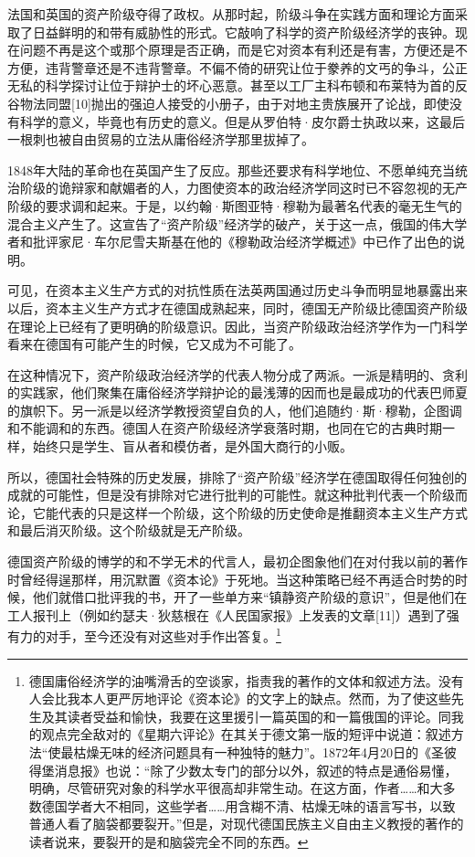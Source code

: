 \documentclass{ctexbook}
\begin{document}
法国和英国的资产阶级夺得了政权。从那时起，阶级斗争在实践方面和理论方面采取了日益鲜明的和带有威胁性的形式。它敲响了科学的资产阶级经济学的丧钟。现在问题不再是这个或那个原理是否正确，而是它对资本有利还是有害，方便还是不方便，违背警章还是不违背警章。不偏不倚的研究让位于豢养的文丐的争斗，公正无私的科学探讨让位于辩护士的坏心恶意。甚至以工厂主科布顿和布莱特为首的反谷物法同盟[10]抛出的强迫人接受的小册子，由于对地主贵族展开了论战，即使没有科学的意义，毕竟也有历史的意义。但是从罗伯特·皮尔爵士执政以来，这最后一根刺也被自由贸易的立法从庸俗经济学那里拔掉了。

1848年大陆的革命也在英国产生了反应。那些还要求有科学地位、不愿单纯充当统治阶级的诡辩家和献媚者的人，力图使资本的政治经济学同这时已不容忽视的无产阶级的要求调和起来。于是，以约翰·斯图亚特·穆勒为最著名代表的毫无生气的混合主义产生了。这宣告了“资产阶级”经济学的破产，关于这一点，俄国的伟大学者和批评家尼·车尔尼雪夫斯基在他的《穆勒政治经济学概述》中已作了出色的说明。

可见，在资本主义生产方式的对抗性质在法英两国通过历史斗争而明显地暴露出来以后，资本主义生产方式才在德国成熟起来，同时，德国无产阶级比德国资产阶级在理论上已经有了更明确的阶级意识。因此，当资产阶级政治经济学作为一门科学看来在德国有可能产生的时候，它又成为不可能了。

在这种情况下，资产阶级政治经济学的代表人物分成了两派。一派是精明的、贪利的实践家，他们聚集在庸俗经济学辩护论的最浅薄的因而也是最成功的代表巴师夏的旗帜下。另一派是以经济学教授资望自负的人，他们追随约·斯·穆勒，企图调和不能调和的东西。德国人在资产阶级经济学衰落时期，也同在它的古典时期一样，始终只是学生、盲从者和模仿者，是外国大商行的小贩。

所以，德国社会特殊的历史发展，排除了“资产阶级”经济学在德国取得任何独创的成就的可能性，但是没有排除对它进行批判的可能性。就这种批判代表一个阶级而论，它能代表的只是这样一个阶级，这个阶级的历史使命是推翻资本主义生产方式和最后消灭阶级。这个阶级就是无产阶级。

德国资产阶级的博学的和不学无术的代言人，最初企图象他们在对付我以前的著作时曾经得逞那样，用沉默置《资本论》于死地。当这种策略已经不再适合时势的时候，他们就借口批评我的书，开了一些单方来“镇静资产阶级的意识”，但是他们在工人报刊上（例如约瑟夫·狄慈根在《人民国家报》上发表的文章[11]）遇到了强有力的对手，至今还没有对这些对手作出答复。\footnote{德国庸俗经济学的油嘴滑舌的空谈家，指责我的著作的文体和叙述方法。没有人会比我本人更严厉地评论《资本论》的文字上的缺点。然而，为了使这些先生及其读者受益和愉快，我要在这里援引一篇英国的和一篇俄国的评论。同我的观点完全敌对的《星期六评论》在其关于德文第一版的短评中说道：叙述方法“使最枯燥无味的经济问题具有一种独特的魅力”。1872年4月20日的《圣彼得堡消息报》也说：“除了少数太专门的部分以外，叙述的特点是通俗易懂，明确，尽管研究对象的科学水平很高却非常生动。在这方面，作者……和大多数德国学者大不相同，这些学者……用含糊不清、枯燥无味的语言写书，以致普通人看了脑袋都要裂开。”但是，对现代德国民族主义自由主义教授的著作的读者说来，要裂开的是和脑袋完全不同的东西。}
\end{document}
